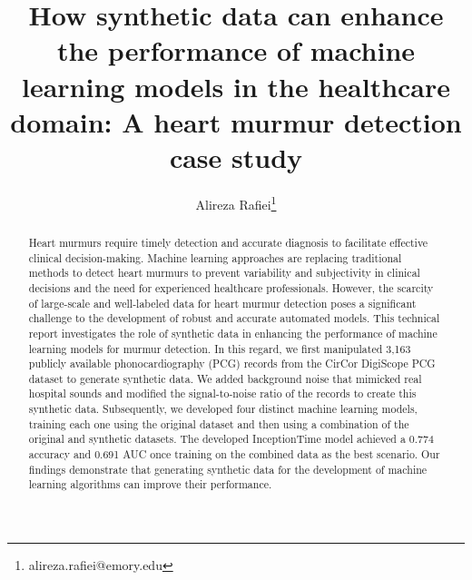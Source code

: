 \documentclass{article}
\date{}
\begin{document}
\title{\LARGE \bf
How synthetic data can enhance the performance of machine learning models in the healthcare domain: A heart murmur detection case study}


\author[1]{Alireza Rafiei\thanks{alireza.rafiei@emory.edu}}


\maketitle

\begin{abstract}

Heart murmurs require timely detection and accurate diagnosis to facilitate effective clinical decision-making. Machine learning approaches are replacing traditional methods to detect heart murmurs to prevent variability and subjectivity in clinical decisions and the need for experienced healthcare professionals. However, the scarcity of large-scale and well-labeled data for heart murmur detection poses a significant challenge to the development of robust and accurate automated models. This technical report investigates the role of synthetic data in enhancing the performance of machine learning models for murmur detection. In this regard, we first manipulated 3,163 publicly available phonocardiography (PCG) records from the CirCor DigiScope PCG dataset to generate synthetic data. We added background noise that mimicked real hospital sounds and modified the signal-to-noise ratio of the records to create this synthetic data. Subsequently, we developed four distinct machine learning models, training each one using the original dataset and then using a combination of the original and synthetic datasets. The developed InceptionTime model achieved a 0.774 accuracy and 0.691 AUC once training on the combined data as the best scenario. Our findings demonstrate that generating synthetic data for the development of machine learning algorithms can improve their performance.

\end{abstract}
\end{document}
